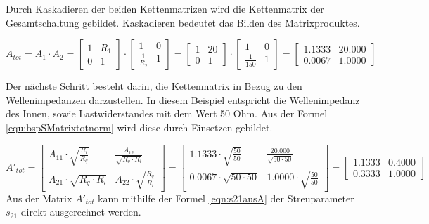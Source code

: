 Durch Kaskadieren der beiden Kettenmatrizen wird die Kettenmatrix der Gesamtschaltung gebildet. Kaskadieren bedeutet das Bilden des Matrixproduktes.

\begin{equation}\label{equ:bspSMatrixtot}
A_{tot} = A_1 \cdot A_2 = \left[\begin{matrix}
			1&R_1\\0&1
			\end{matrix}\right] \cdot  \left[\begin{matrix}
			1&0\\\frac{1}{R_2}&1
			\end{matrix}\right]
			= \left[\begin{matrix}
			1&20\\0&1
			\end{matrix}\right] \cdot \left[\begin{matrix}
			1&0\\\frac{1}{150}&1
			\end{matrix}\right] =
			\left[\begin{matrix}
			1.1333&20.000\\0.0067&1.0000
			\end{matrix}\right]
\end{equation}

Der nächste Schritt besteht darin, die Kettenmatrix in Bezug zu den Wellenimpedanzen darzustellen. In diesem Beispiel entspricht die Wellenimpedanz des Innen, sowie Lastwiderstandes mit dem Wert 50 Ohm. Aus der Formel \ref{equ:bspSMatrixtotnorm}  wird diese durch Einsetzen gebildet.

\begin{equation}\label{equ:bspSMatrixtotnorm}
			A'_{tot} = \left[\begin{matrix}
			A_{11}\cdot\sqrt{ \frac{ R_{ l } }{ R_{ q } } }
			&
			\frac{A_{12}}{\sqrt{R_q \cdot R_l}}
			\\
			A_{21} \cdot \sqrt{R_q \cdot R_l}
			&
			A_{22} \cdot \sqrt{\frac{R_q}{R_l}}
			\end{matrix}\right]
			=
			\left[\begin{matrix}
			1.1333\cdot\sqrt{ \frac{ 50}{50} }
			&
			\frac{20.000}{\sqrt{50\cdot 50}}
			\\
			0.0067 \cdot \sqrt{50 \cdot 50}
			&
			1.0000 \cdot \sqrt{\frac{50}{50}}
			\end{matrix}\right]
			=
			\left[\begin{matrix}
			1.1333
			&
			0.4000
			\\
			0.3333
			&
			1.0000
			\end{matrix}\right]
\end{equation}
Aus der Matrix $A'_{tot}$ kann mithilfe der Formel \ref{eqn:s21ausA} der Streuparameter $s_{21}$ direkt ausgerechnet werden.

